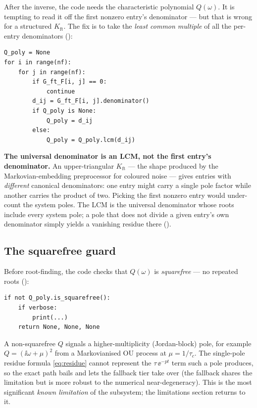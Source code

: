After the inverse, the code needs the characteristic polynomial $Q(\omega)$. It
is tempting to read it off the first nonzero entry's denominator --- but that is
wrong for a structured $K_{\mathrm{ft}}$. The fix is to take the \emph{least
common multiple} of all the per-entry denominators
():

\begin{lstlisting}
Q_poly = None
for i in range(nf):
    for j in range(nf):
        if G_ft_F[i, j] == 0:
            continue
        d_ij = G_ft_F[i, j].denominator()
        if Q_poly is None:
            Q_poly = d_ij
        else:
            Q_poly = Q_poly.lcm(d_ij)
\end{lstlisting}

\begin{gotcha}
\textbf{The universal denominator is an LCM, not the first entry's denominator.}
An upper-triangular $K_{\mathrm{ft}}$ --- the shape produced by the
Markovian-embedding preprocessor for coloured noise --- gives entries with
\emph{different} canonical denominators: one entry might carry a single pole
factor while another carries the product of two. Picking the first nonzero entry
would under-count the system poles. The LCM is the universal denominator whose
roots include every system pole; a pole that does not divide a given entry's own
denominator simply yields a vanishing residue there
().
\end{gotcha}

\subsection{The squarefree guard}

Before root-finding, the code checks that $Q(\omega)$ is \emph{squarefree} --- no
repeated roots ():

\begin{lstlisting}
if not Q_poly.is_squarefree():
    if verbose:
        print(...)
    return None, None, None
\end{lstlisting}

A non-squarefree $Q$ signals a higher-multiplicity (Jordan-block) pole, for
example $Q = (\ii\omega + \mu)^2$ from a Markovianised OU process at $\mu =
1/\tau_c$. The single-pole residue formula \eqref{eq:residue} cannot represent the
$\tau\,\ee^{-pt}$ term such a pole produces, so the exact path bails and lets the
fallback tier take over (the fallback shares the limitation but is more robust to
the numerical near-degeneracy). This is the most significant \emph{known
limitation} of the subsystem; the limitations section returns to it.

